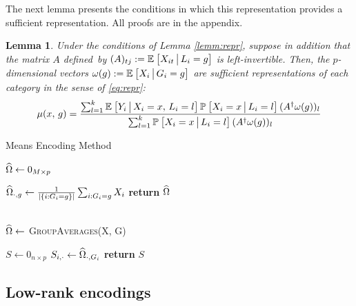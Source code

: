 \documentclass{article}
\theoremstyle{plain}
\newtheorem{lemm}[prop]{Lemma}
\theoremstyle{definition}
\theoremstyle{remark}
\begin{document}
The next lemma presents the conditions in which this representation provides a sufficient representation. All proofs are in the appendix.

\begin{lemm}
\label{lemm:means}
Under the conditions of Lemma \ref{lemm:repr}, suppose in addition that the matrix $A$ defined~by $(A)_{tj} := \mathbb{E}_{}\left[X_{it} \,\big|\, L_{i} = g\right]$
is left-invertible. Then, the $p$-dimensional vectors $\omega(g) := \mathbb{E}_{}\left[X_{i} \,\big|\, G_i = g\right]$ are sufficient representations of each category in the sense of \eqref{eq:repr}:
\begin{equation}
\label{eq:explicit_mom}
\mu(x, \, g) = \frac{\sum_{l = 1}^k  \mathbb{E}_{}\left[Y_i \,\big|\, X_i = x, \, L_i = l\right] \mathbb{P}_{}\left[X_i = x \,\big|\, L_i = l\right] (A^\dagger \omega(g))_l}{\sum_{l = 1}^k \mathbb{P}_{}\left[X_i = x \,\big|\, L_i = l\right] (A^\dagger \omega(g))_l}
\end{equation}
\end{lemm}


\begin{algorithm}
\label{alg:means}
\caption{Means Encoding Method}
\begin{algorithmic}[1]

  \State $\widehat{\Omega} \gets 0_{M \times p}$

  \vspace{0.09cm}
  \State $\widehat{\Omega}_{\cdot,g} \gets \frac{1}{|\{i:G_{i}=g\}|}\sum_{i:G_{i}=g}X_{i}$
  \EndFor
  \State \textbf{return} $\widehat{\Omega}$
  \EndProcedure

  \\

  \State $\widehat{\Omega} \gets$ \textsc{GroupAverages}(X, G)

  \State $S \gets 0_{n \times p}$
  \State $S_{i,\cdot} \gets \widehat{\Omega}_{\cdot,G_{i}}$
  \EndFor
  \State \textbf{return} $S$
  \EndProcedure

\end{algorithmic}
\end{algorithm}





\subsection{Low-rank encodings}
\label{subsec:lowrank}
\end{document}
